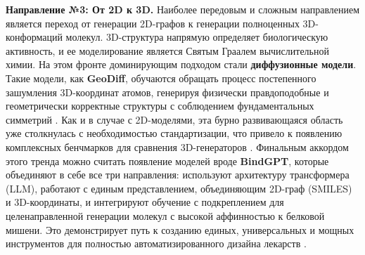 \textbf{Направление №3: От 2D к 3D.}
Наиболее передовым и сложным направлением является переход от генерации 2D-графов к генерации полноценных 3D-конформаций молекул. 3D-структура напрямую определяет биологическую активность, и ее моделирование является Святым Граалем вычислительной химии. На этом фронте доминирующим подходом стали \textbf{диффузионные модели}. Такие модели, как \textbf{GeoDiff}, обучаются обращать процесс постепенного зашумления 3D-координат атомов, генерируя физически правдоподобные и геометрически корректные структуры с соблюдением фундаментальных симметрий \cite{xu2022geodiff}. Как и в случае с 2D-моделями, эта бурно развивающаяся область уже столкнулась с необходимостью стандартизации, что привело к появлению комплексных бенчмарков для сравнения 3D-генераторов \cite{qin2025comprehensive}. Финальным аккордом этого тренда можно считать появление моделей вроде \textbf{BindGPT}, которые объединяют в себе все три направления: используют архитектуру трансформера (LLM), работают с единым представлением, объединяющим 2D-граф (SMILES) и 3D-координаты, и интегрируют обучение с подкреплением для целенаправленной генерации молекул с высокой аффинностью к белковой мишени. Это демонстрирует путь к созданию единых, универсальных и мощных инструментов для полностью автоматизированного дизайна лекарств \cite{zholus2025bindgpt}.
